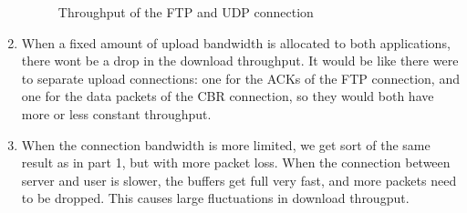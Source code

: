 \documentclass[a4paper,12pt,titlepage]{report}
\begin{document}
\begin{enumerate}
\begin{figure}[htb]
\caption{Throughput of the FTP and UDP connection}
\label{upAndDown}
\end{figure}
\item When a fixed amount of upload bandwidth is allocated to both applications, there wont be a drop in the download throughput. It would be like there were to separate upload connections: one for the ACKs of the FTP connection, and one for the data packets of the CBR connection, so they would both have more or less constant throughput.\\
\item When the connection bandwidth is more limited, we get sort of the same result as in part 1, but with more packet loss. When the connection between server and user is slower, the buffers get full very fast, and more packets need to be dropped. This causes large fluctuations in download througput. \\
\end{enumerate}
\end{document}
